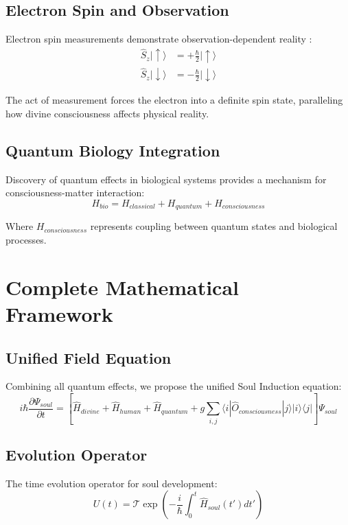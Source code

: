 \documentclass[12pt,a4paper]{article}
\begin{document}
\subsection{Electron Spin and Observation}
Electron spin measurements demonstrate observation-dependent reality \cite{aspect2023}:
\begin{align}
\hat{S}_z|\uparrow\rangle &= +\frac{\hbar}{2}|\uparrow\rangle \\
\hat{S}_z|\downarrow\rangle &= -\frac{\hbar}{2}|\downarrow\rangle
\end{align}

The act of measurement forces the electron into a definite spin state, paralleling how divine consciousness affects physical reality.

\subsection{Quantum Biology Integration}
Discovery of quantum effects in biological systems \cite{alkhalili2024} provides a mechanism for consciousness-matter interaction:
\begin{equation}
H_{bio} = H_{classical} + H_{quantum} + H_{consciousness}
\end{equation}

Where $H_{consciousness}$ represents coupling between quantum states and biological processes.

\section{Complete Mathematical Framework}

\subsection{Unified Field Equation}
Combining all quantum effects, we propose the unified Soul Induction equation:
\begin{equation}
i\hbar \frac{\partial\Psi_{soul}}{\partial t} = \left[\hat{H}_{divine} + \hat{H}_{human} + \hat{H}_{quantum} + g\sum_{i,j}\langle i|\hat{O}_{consciousness}|j\rangle|i\rangle\langle j|\right]\Psi_{soul}
\end{equation}

\subsection{Evolution Operator}
The time evolution operator for soul development:
\begin{equation}
U(t) = \mathcal{T} \exp\left(-\frac{i}{\hbar} \int_0^t \hat{H}_{soul}(t') dt'\right)
\end{equation}
\end{document}
